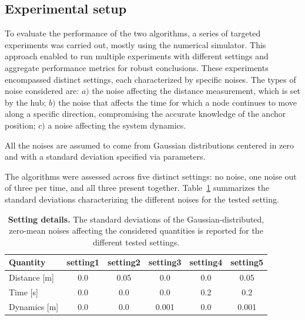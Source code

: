 \subsection{Experimental setup}
To evaluate the performance of the two algorithms, a series of targeted experiments was carried out, mostly using the numerical simulator. 
This approach enabled to run multiple experiments with different settings and aggregate performance metrics for robust conclusions. 
These experiments encompassed distinct settings, each characterized by specific noises. The types of noise considered are: $a)$ the noise affecting the distance measurement, which is set by the hub; $b)$ the noise that affects the time for which a node continues to move along a specific direction, compromising the accurate knowledge of the anchor position; $c)$ a noise affecting the system dynamics.\par

All the noises are assumed to come from Gaussian distributions centered in zero and with a standard deviation specified via parameters.\par

The algorithms were assessed across five distinct settings: no noise, one noise out of three per time, and all three present together. Table~\ref{tab:std_summary_comparison} summarizes the standard deviations characterizing the different noises for the tested setting. 
\begin{table}[!ht]
    \centering
    \begin{tabular}{l|ccccc}
      \textbf{Quantity} & 
      \textbf{setting1} &
      \textbf{setting2} &
      \textbf{setting3} &
      \textbf{setting4} & 
      \textbf{setting5} \\
      \hline
      Distance [m]& 0.0 & 0.05 & 0.0   & 0.0 & 0.05   \\
      Time [s] & 0.0 & 0.0  & 0.0   & 0.2 & 0.2    \\
      Dynamics [m]& 0.0 & 0.0  & 0.001 & 0.0 & 0.001  \\
    \end{tabular}
      \caption[Setting details]{
        \textbf{Setting details.}
        The standard deviations of the Gaussian-distributed, zero-mean noises affecting the considered quantities is reported for the different tested settings.
    }
    \label{tab:std_summary_comparison}
\end{table}



